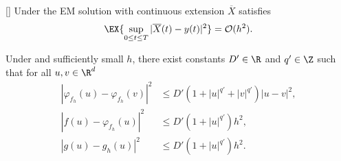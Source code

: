 
\begin{thm}\label{thm:EulerConvergenceRateHMS}[{\citet[Thm 4.4]{Higham2002b}}]
	Under  the EM solution with continuous extension $\overline{X}$
	satisfies
	\begin{equation}
		\EX{
			\sup_{0\leq t \leq T}
			|\overline{X}(t)- y(t)|^2
		} = \mathcal{O}(h^2).
	\end{equation}
\end{thm}
%
\begin{lem}
	Under  and sufficiently small $h$, there exist
	constants $D'\in \R$ and $q'\in \Z$ such that for all $u,v\in \R^d$
	\begin{align}
		|
			\varphi_{f_h}(u)
			-\varphi_{f_h}(v)
		|^2 
		&\leq
			D'
			\left(
				1 +|u|^{q'} +|v|^{q'}
			\right)
			|u-v|^2, \\
		|
			 f(u) -\varphi_{f_h}(u)
		|^2 
		&\leq
			D'
			\left(
				1 +|u|^{q'} 
				\right)
			h^2, \\
		|
			g(u) -g_h(u)
		|^2 				 
		&\leq
			D'
			\left(
				1 +|u|^{q'} 
			\right)
			h^2 . \label{eqn:ghPolyGrowth}
	\end{align}
\end{lem}

